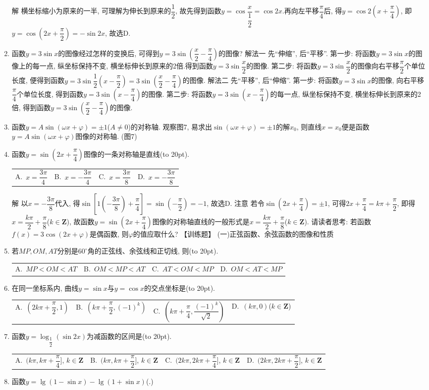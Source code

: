 \documentclass[10pt,a4paper]{article}
\newcommand{\bracket}[1]{(\hbox to #1pt{})}
\newcommand{\fourch}[4]{\par\begin{tabular}{p{.23\textwidth}p{.23\textwidth}p{.23\textwidth}p{.23\textwidth}}
A.~#1 &B.~#2& C.~#3& D.~#4
\end{tabular}}
\begin{document}
\begin{enumerate}[1.]
解  横坐标缩小为原来的一半, 可理解为伸长到原来的$\dfrac 12$, 故先得到函数$y=\cos \dfrac x{\dfrac 12}=\cos 2x$.再向左平移$\dfrac{\pi}4$后, 得$y=\cos 2(x+\dfrac{\pi}4)$, 即$y=\cos (2x+\dfrac{\pi}2)=-\sin 2x$, 故选D.
\item 函数$y=3\sin x$的图像经过怎样的变换后, 可得到$y=3\sin (\dfrac x2-\dfrac{\pi}4)$的图像?
解法一  先``伸缩'', 后``平移''.
第一步: 将函数$y=3\sin x$的图像上的每一点, 纵坐标保持不变, 横坐标伸长到原来的2倍.得到函数$y=3\sin \dfrac x2$的图像.
第二步: 将函数$y=3\sin \dfrac x2$的图像向右平移$\dfrac{\pi}2$个单位长度, 便得到函数$y=3\sin \dfrac 12(x-\dfrac{\pi}2)=3\sin (\dfrac x2-\dfrac{\pi}4)$的图像.
解法二  先``平移'', 后``伸缩''.
第一步: 将函数$y=3\sin x$的图像, 向右平移$\dfrac{\pi}4$个单位长度, 得到函数$y=3\sin (x-\dfrac{\pi}4)$的图像.
第二步: 将函数$y=3\sin (x-\dfrac{\pi}4)$的每一点, 纵坐标保持不变, 横坐标伸长到原来的2倍, 得到函数$y=3\sin (\dfrac x2-\dfrac{\pi}4)$的图像.
\item 函数$y=A\sin (\omega x+\varphi)=\pm 1$($A\ne 0$)的对称轴.
观察图7, 易求出$\sin (\omega x+\varphi)=\pm 1$的解$x_0$, 则直线$x=x_0$便是函数$y=A\sin (\omega x+\varphi)$图像的对称轴.
(图7)
\item 函数$y=\sin (2x+\dfrac{\pi}4)$图像的一条对称轴是直线\bracket{20}.
\fourch{$x=\dfrac{3\pi}4$}{$x=-\dfrac{3\pi}4$}{$x=\dfrac{3\pi}8$}{$x=-\dfrac{3\pi}8$}
解  以$x=-\dfrac{3\pi}8$代入, 得$\sin [1(-\dfrac{3\pi}8)+\dfrac{\pi}4]=\sin (-\dfrac{\pi}2)=-1$, 故选D.
注意  若令$\sin (2x+\dfrac{\pi}4)=\pm 1$, 可得$2x+\dfrac{\pi}4=k\pi +\dfrac{\pi}2$, 即得$x=\dfrac{k\pi}2+\dfrac{\pi}8$($k\in \mathbf{Z}$), 故函数$y=\sin (2x+\dfrac{\pi}4)$图像的对称轴直线的一般形式是$x=\dfrac{k\pi}2+\dfrac{\pi}8$($k\in \mathbf{Z}$).
请读者思考: 若函数$f(x)=3\cos (2x+\varphi)$是偶函数, 则$\varphi$的值应取什么?
【训练题】
(一)正弦函数、余弦函数的图像和性质
\item 若$MP,OM,AT$分别是$60^\circ$角的正弦线、余弦线和正切线, 则\bracket{20}.
\fourch{$MP<OM<AT$}{$OM<MP<AT$}{$AT<OM<MP$}{$OM<AT<MP$}
\item 在同一坐标系内, 曲线$y=\sin x$与$y=\cos x$的交点坐标是\bracket{20}.
\fourch{$(2k\pi +\dfrac{\pi}2,1)$}{$(k\pi +\dfrac{\pi}2,(-1)^k)$}{$(k\pi +\dfrac{\pi}4,\dfrac{(-1)^k}{\sqrt 2})$}{$(k\pi ,0)$($k\in \mathbf{Z}$)}
\item 函数$y=\log _{\dfrac 12}(\sin 2x)$为减函数的区间是\bracket{20}.
\fourch{$(k\pi ,k\pi +\dfrac{\pi}4]$, $k\in \mathbf{Z}$}{$(k\pi ,k\pi +\dfrac{\pi}2]$, $k\in \mathbf{Z}$}{$(2k\pi ,2k\pi +\dfrac{\pi}4]$, $k\in \mathbf{Z}$}{$(2k\pi ,2k\pi +\dfrac{\pi}2]$, $k\in \mathbf{Z}$}
\item 函数$y=\lg (1-\sin x)-\lg (1+\sin x)$(.)

\end{enumerate}
\end{document}
